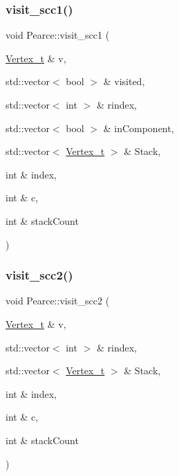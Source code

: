 \mbox{\label{class_pearce_ae4e9364dd0c829564ecfbfe8ccc07b6a}} 
\subsubsection{\texorpdfstring{visit\+\_\+scc1()}{visit\_scc1()}}
{\footnotesize\ttfamily void Pearce\+::visit\+\_\+scc1 (\begin{DoxyParamCaption}\item[{\hyperlink{class_graph_component_ae67114a6ce5a001dc35e1996e1b45aa0}{Vertex\+\_\+t} \&}]{v,  }\item[{std\+::vector$<$ bool $>$ \&}]{visited,  }\item[{std\+::vector$<$ int $>$ \&}]{rindex,  }\item[{std\+::vector$<$ bool $>$ \&}]{in\+Component,  }\item[{std\+::vector$<$ \hyperlink{class_graph_component_ae67114a6ce5a001dc35e1996e1b45aa0}{Vertex\+\_\+t} $>$ \&}]{Stack,  }\item[{int \&}]{index,  }\item[{int \&}]{c,  }\item[{int \&}]{stack\+Count }\end{DoxyParamCaption})}

\mbox{\label{class_pearce_a12c836f8f0dbd85e20c0f3f4f0c5fb47}} 
\subsubsection{\texorpdfstring{visit\+\_\+scc2()}{visit\_scc2()}}
{\footnotesize\ttfamily void Pearce\+::visit\+\_\+scc2 (\begin{DoxyParamCaption}\item[{\hyperlink{class_graph_component_ae67114a6ce5a001dc35e1996e1b45aa0}{Vertex\+\_\+t} \&}]{v,  }\item[{std\+::vector$<$ int $>$ \&}]{rindex,  }\item[{std\+::vector$<$ \hyperlink{class_graph_component_ae67114a6ce5a001dc35e1996e1b45aa0}{Vertex\+\_\+t} $>$ \&}]{Stack,  }\item[{int \&}]{index,  }\item[{int \&}]{c,  }\item[{int \&}]{stack\+Count }\end{DoxyParamCaption})}


